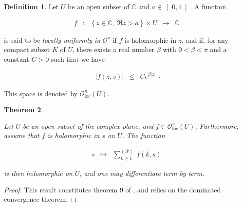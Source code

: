 \documentclass{jams-l}
\newtheorem{theorem}{Theorem}[section]
\theoremstyle{definition}
\newtheorem{definition}[theorem]{Definition}
\theoremstyle{remark}
\numberwithin{equation}{section}
\begin{document}
        \begin{definition}
        
            Let $U$ be an open subset of $\mathbb{C}$ and $a \in \left] 0,1 \right[$. A function
            
            \[ \begin{array}{lllll}
                    f & : & \left \{ z \in \mathbb{C}, \; \Re z > a\right \} \times U & \longrightarrow & \mathbb{C}
                \end{array} \]
            
            \noindent is said to be \textit{locally uniformly in} $\mathcal{O}^{\pi}$ if $f$ is holomorphic in $z$, and if, for any compact subset $K$ of $U$, there exists a real number $\beta$ with $0 < \beta < \pi$ and a constant $C > 0$ such that we have
            
            \[ \begin{array}{ccc}
                    \left \vert f \left( z, s \right) \right \vert & \leqslant & C e^{\beta \left \vert z \right \vert}
                \end{array} . \]
            
            \noindent This space is denoted by $\mathcal{O}^{\pi}_{\mathrm{loc}} \left( U \right)$.
        
        \end{definition}
        
        \begin{theorem}
        \label{ThmAnalycityRamanujanSum}
        
            Let $U$ be an open subset of the complex plane, and $f \in \mathcal{O}^{\pi}_{\mathrm{loc}} \left( U \right)$. Furthermore, assume that $f$ is holomorphic in $s$ on $U$. The function
            
            \[ \begin{array}{lll}
                    s & \longmapsto & \sum\limits_{k \geqslant 1}^{\left( \mathcal{R} \right)} \; f \left( k, s \right)
                \end{array} \]
            
            \noindent is then holomorphic on $U$, and one may differentiate term by term.
        
        \end{theorem}
        
        \begin{proof}
        
            This result constitutes theorem $9$ of \cite[Sec. 3.1.1]{MR3677185}, and relies on the dominated convergence theorem.
        
        \end{proof}
       
\end{document}
